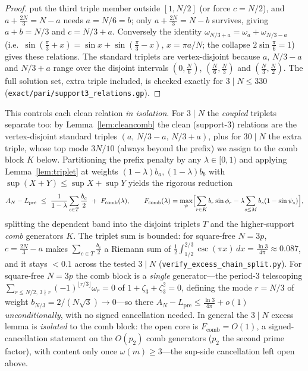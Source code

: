 \begin{proof}
put the third triple member outside $[1,N/2]$ (or force $c=N/2$), and $a+\tfrac{2N}3=N-a$ needs $a=N/6=b$;
only $a+\tfrac{2N}3=N-b$ survives, giving $a+b=N/3$ and $c=N/3+a$. Conversely the identity
$\omega_{N/3+a}=\omega_a+\omega_{N/3-a}$ (i.e.\ $\sin(\tfrac\pi3+x)=\sin x+\sin(\tfrac\pi3-x)$,
$x=\pi a/N$; the collapse $2\sin\tfrac\pi6=1$) gives these relations. The standard triplets are
vertex-disjoint because $a$, $N/3-a$ and $N/3+a$ range over the disjoint intervals $(0,\tfrac N6)$,
$(\tfrac N6,\tfrac N3)$ and $(\tfrac N3,\tfrac N2)$. The full solution set, extra triple included, is checked
exactly for $3\mid N\le330$ (\texttt{exact/pari/support3\_relations.gp}).
\end{proof}

\noindent This controls each clean relation \emph{in isolation}. For $3\mid N$ the \emph{coupled} triplets
separate too: by Lemma~\ref{lem:cleancomb} the clean (support-$3$) relations are the vertex-disjoint
standard triples $(a,\,N/3-a,\,N/3+a)$, plus for $30\mid N$ the extra triple, whose top mode $3N/10$ (always
beyond the prefix) we assign to the comb block $K$ below. Partitioning the prefix penalty by any
$\lambda\in[0,1)$ and applying Lemma~\ref{lem:triplet} at weights $(1-\lambda)b_a,(1-\lambda)b_b$ with
$\sup(X{+}Y)\le\sup X+\sup Y$ yields the rigorous reduction
\[
  A_N-L_{\mathrm{pre}}\ \le\ \frac1{1-\lambda}\sum_{c\in T}\frac{b_c}2\ +\ F_{\mathrm{comb}}(\lambda),\qquad
  F_{\mathrm{comb}}(\lambda)=\max_{\psi}\Bigl[\sum_{r\in K}b_r\sin\phi_r-\lambda\!\sum_{s\le M}b_s(1-\sin\psi_s)\Bigr],
\]
splitting the dependent band into the disjoint triplets $T$ and the higher-support \emph{comb} generators
$K$. The triplet sum is bounded: for square-free $N=3p$, $c=\tfrac{2N}3-a$ makes $\sum_{c\in T}\tfrac{b_c}2$
a Riemann sum of $\tfrac12\int_{1/2}^{2/3}\csc(\pi x)\,dx=\tfrac{\ln3}{4\pi}\approx0.087$, and it stays
$<0.1$ across the tested $3\mid N$ (\texttt{verify\_excess\_chain\_split.py}). For square-free $N=3p$ the comb
block is a \emph{single} generator---the period-$3$ telescoping
$\sum_{r\le N/2,\,3\nmid r}(-1)^{\lfloor r/3\rfloor}\omega_r=0$ of $1+\zeta_3+\zeta_3^2=0$, defining the mode
$r=N/3$ of weight $b_{N/3}=2/(N\sqrt3)\to0$---so there
$A_N-L_{\mathrm{pre}}\le\tfrac{\ln3}{4\pi}+o(1)$ \emph{unconditionally}, with no signed cancellation needed.
In general the $3\mid N$ excess lemma is \emph{isolated} to the comb block: the open core is
$F_{\mathrm{comb}}=O(1)$, a signed-cancellation statement on the $O(p_2)$ comb generators ($p_2$ the second
prime factor), with content only once $\omega(m)\ge3$---the sup-side cancellation left open above.

